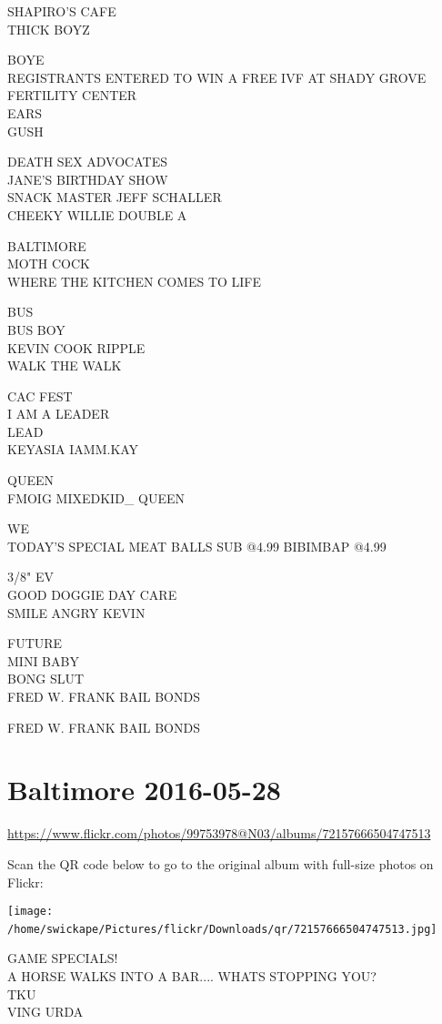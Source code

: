 \documentclass[10pt,letterpaper]{article}
\begin{document}
SHAPIRO'S CAFE\\
THICK BOYZ

BOYE\\
REGISTRANTS ENTERED TO WIN A FREE IVF AT SHADY GROVE FERTILITY CENTER\\
EARS\\
GUSH

DEATH SEX ADVOCATES\\
JANE'S BIRTHDAY SHOW\\
SNACK MASTER JEFF SCHALLER\\
CHEEKY WILLIE DOUBLE A

BALTIMORE\\
MOTH COCK\\
WHERE THE KITCHEN COMES TO LIFE

BUS\\
BUS BOY\\
KEVIN COOK RIPPLE\\
WALK THE WALK

CAC FEST\\
I AM A LEADER\\
LEAD\\
KEYASIA IAMM.KAY

QUEEN\\
FMOIG MIXEDKID\_ QUEEN

WE\\
TODAY'S SPECIAL MEAT BALLS SUB @4.99 BIBIMBAP @4.99

3/8" EV\\
GOOD DOGGIE DAY CARE\\
SMILE ANGRY KEVIN

FUTURE\\
MINI BABY\\
BONG SLUT\\
FRED W. FRANK BAIL BONDS

FRED W. FRANK BAIL BONDS
\

\section*{Baltimore 2016-05-28}

\url{https://www.flickr.com/photos/99753978@N03/albums/72157666504747513}

Scan the QR code below to go to the original album with full-size photos on Flickr:

\texttt{[image: /home/swickape/Pictures/flickr/Downloads/qr/72157666504747513.jpg]}
\

GAME SPECIALS!\\
A HORSE WALKS INTO A BAR.... WHATS STOPPING YOU?\\
TKU\\
VING URDA
\end{document}

